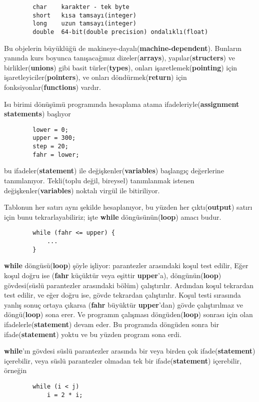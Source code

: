 \documentclass[a4paper,12pt,oneside]{book}
\begin{document}
\begin{lstlisting}
        char    karakter - tek byte
        short   kısa tamsayı(integer)
        long    uzun tamsayı(integer)
        double  64-bit(double precision) ondalıklı(float)
\end{lstlisting}
Bu objelerin büyüklüğü de makineye-dayalı(\textbf{machine-dependent}). Bunların yanında kurs boyunca tanışacağımız dizeler(\textbf{arrays}), yapılar(\textbf{structers}) ve birlikler(\textbf{unions}) gibi basit türler(\textbf{types}), onları işaretlemek(\textbf{pointing}) için işaretleyiciler(\textbf{pointers}), ve onları döndürmek(\textbf{return}) için fonksiyonlar(\textbf{functions}) vardır. \pagebreak
\par Isı birimi dönüşümü programında hesaplama atama ifadeleriyle(\textbf{assignment statements}) başlıyor
\begin{lstlisting}
        lower = 0;
        upper = 300;
        step = 20;
        fahr = lower;
\end{lstlisting}
bu ifadeler(\textbf{statement}) ile değişkenler(\textbf{variables}) başlangıç değerlerine tanımlanıyor. Tekli(toplu değil, bireysel) tanımlanmak istenen değişkenler(\textbf{variables}) noktalı virgül ile bitiriliyor.
\par Tablonun her satırı aynı şekilde hesaplanıyor, bu yüzden her çıktı(\textbf{output}) satırı için bunu tekrarlayabiliriz; işte \textbf{while} döngüsünün(\textbf{loop}) amacı budur.
\begin{lstlisting}
        while (fahr <= upper) {
            ...
        }
\end{lstlisting}
\textbf{while} döngüsü(\textbf{loop}) şöyle işliyor: parantezler arasındaki koşul test edilir, Eğer koşul doğru ise (\textbf{fahr} küçüktür veya eşittir \textbf{upper}'a), döngünün(\textbf{loop}) gövdesi(süslü parantezler arasındaki bölüm) çalıştırılır. Ardından koşul tekrardan test edilir, ve eğer doğru ise, gövde tekrardan çalıştırılır. Koşul testi sırasında yanlış sonuç ortaya çıkarsa (\textbf{fahr} büyüktür \textbf{upper}'dan) gövde çalıştırılmaz ve döngü(\textbf{loop}) sona erer. Ve programın çalışması döngüden(\textbf{loop}) sonrası için olan ifadelerle(\textbf{statement}) devam eder. Bu programda döngüden sonra bir ifade(\textbf{statement}) yoktu ve bu yüzden program sona erdi.
\par \textbf{while}'ın gövdesi süslü parantezler arasında bir veya birden çok ifade(\textbf{statement}) içerebilir, veya süslü parantezler olmadan tek bir ifade(\textbf{statement}) içerebilir, örneğin
\begin{lstlisting}
        while (i < j)
            i = 2 * i;
\end{lstlisting}
\end{document}
